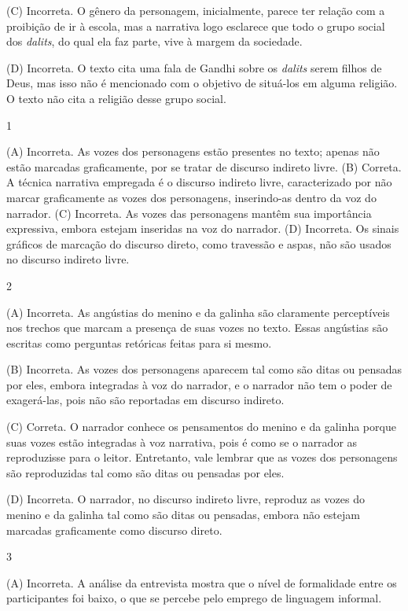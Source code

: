 (C) Incorreta. O gênero da personagem, inicialmente, parece ter relação
com a proibição de ir à escola, mas a narrativa logo esclarece que todo
o grupo social dos \emph{dalits}, do qual ela faz parte, vive à margem
da sociedade.

(D) Incorreta. O texto cita uma fala de Gandhi sobre os \emph{dalits}
serem filhos de Deus, mas isso não é mencionado com o objetivo de
situá-los em alguma religião. O texto não cita a religião desse grupo
social.


\num{1}

(A) Incorreta. As vozes dos personagens estão presentes no texto; apenas
não estão marcadas graficamente, por se tratar de discurso indireto
livre. 
(B) Correta. A técnica narrativa empregada é o discurso indireto
livre, caracterizado por não marcar graficamente as vozes dos
personagens, inserindo-as dentro da voz do narrador. 
(C) Incorreta. As
vozes das personagens mantêm sua importância expressiva, embora estejam
inseridas na voz do narrador. 
(D) Incorreta. Os sinais gráficos de
marcação do discurso direto, como travessão e aspas, não são usados no
discurso indireto livre.

\num{2}

(A) Incorreta. As angústias do menino e da galinha são claramente
perceptíveis nos trechos que marcam a presença de suas vozes no texto.
Essas angústias são escritas como perguntas retóricas feitas para si
mesmo.

(B) Incorreta. As vozes dos personagens aparecem tal como são ditas ou
pensadas por eles, embora integradas à voz do narrador, e o narrador não
tem o poder de exagerá-las, pois não são reportadas em discurso
indireto.

(C) Correta. O narrador conhece os pensamentos do menino e da galinha
porque suas vozes estão integradas à voz narrativa, pois é como se o
narrador as reproduzisse para o leitor. Entretanto, vale lembrar que as
vozes dos personagens são reproduzidas tal como são ditas ou pensadas
por eles.

(D) Incorreta. O narrador, no discurso indireto livre, reproduz as vozes
do menino e da galinha tal como são ditas ou pensadas, embora não
estejam marcadas graficamente como discurso direto.

\num{3}

(A) Incorreta. A análise da entrevista mostra que o nível de formalidade
entre os participantes foi baixo, o que se percebe pelo emprego de
linguagem informal.

